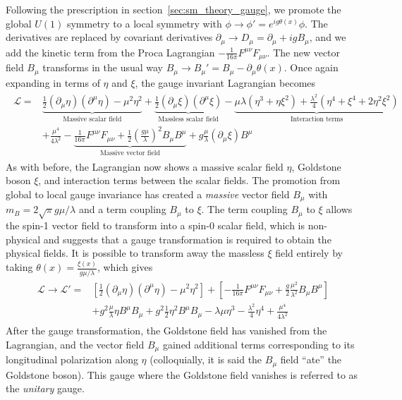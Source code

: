 Following the prescription in section~\ref{sec:sm_theory_gauge}, we promote the global $U(1)$ symmetry to a local symmetry with $\phi\to\phi'=e^{ig\theta(x)}\phi$. The derivatives are replaced by covariant derivatives $\partial_\mu\to D_\mu=\partial_\mu+igB_\mu$, and we add the kinetic term from the Proca Lagrangian $-\frac{1}{16\pi}F^{\mu\nu}F_{\mu\nu}$. The new vector field $B_\mu$ transforms in the usual way $B_\mu\to B_\mu'=B_\mu-\partial_\mu\theta(x)$. Once again expanding in terms of $\eta$ and $\xi$, the gauge invariant Lagrangian becomes
\begin{align}
	\begin{split}
	\mathcal{L}=&\underbrace{\frac{1}{2}(\partial_\mu\eta)(\partial^\mu\eta)-\mu^2\eta^2}_\text{Massive scalar field}+\underbrace{\frac{1}{2}(\partial_\mu\xi)(\partial^\mu\xi)}_\text{Massless scalar field}-\underbrace{\mu\lambda(\eta^3+\eta\xi^2)+\frac{\lambda^2}{4}(\eta^4+\xi^4+2\eta^2\xi^2)}_\text{Interaction terms}\\
	&+\frac{\mu^4}{4\lambda^2}-\underbrace{\frac{1}{16\pi}F^{\mu\nu}F_{\mu\nu}+\frac{1}{2}\left(\frac{g\mu}{\lambda}\right)^2B_\mu B^\mu}_\text{Massive vector field}+g\frac{\mu}{\lambda}(\partial_\mu\xi)B^\mu
	\end{split}
\end{align}
As with before, the Lagrangian now shows a massive scalar field $\eta$, Goldstone boson $\xi$, and interaction terms between the scalar fields. The promotion from global to local gauge invariance has created a \textit{massive} vector field $B_\mu$ with $m_B=2\sqrt{\pi}g\mu/\lambda$ and a term coupling $B_\mu$ to $\xi$. The term coupling $B_\mu$ to $\xi$ allows the spin-1 vector field to transform into a spin-0 scalar field, which is non-physical and suggests that a gauge transformation is required to obtain the physical fields. It is possible to transform away the massless $\xi$ field entirely by taking $\theta(x)=\frac{\xi(x)}{g\mu/\lambda}$, which gives
\begin{align}
	\begin{split}
		\mathcal{L}\to\mathcal{L'}=&\left[\frac{1}{2}(\partial_\mu\eta)(\partial^\mu\eta)-\mu^2\eta^2\right]+\left[-\frac{1}{16\pi}F^{\mu\nu}F_{\mu\nu}+\frac{g}{2}\frac{\mu^2}{\lambda^2}B_\mu B^\mu\right]\\
		&+g^2\frac{\mu}{\lambda}\eta B^\mu B_\mu+g^2\frac{1}{2}\eta^2B^\mu B_\mu-\lambda\mu\eta^3-\frac{\lambda^2}{4}\eta^4+\frac{\mu^4}{4\lambda^2}
	\end{split}
\end{align}
After the gauge transformation, the Goldstone field has vanished from the Lagrangian, and the vector field $B_\mu$ gained additional terms corresponding to its longitudinal polarization along $\eta$ (colloquially, it is said the $B_\mu$ field ``ate'' the Goldstone boson). This gauge where the Goldstone field vanishes is referred to as the \textit{unitary} gauge.

